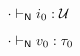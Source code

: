 {\begin{lamportproof*}
    \begin{pfproof}
      \qedstep
        \begin{pfproof}
          ${\cdot} \vdash_{\mathsf{N}} i_0 : {\mathcal U}$
        \end{pfproof}
    \end{pfproof}

    \begin{pfproof}
      \absurdstep
        \begin{pfproof}
          ${\cdot} \vdash_{\mathsf{N}} v_0 : \tau_0$
        \end{pfproof}
    \end{pfproof}

\end{lamportproof*}}

